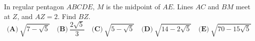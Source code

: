 In regular pentagon $ABCDE$, $M$ is the midpoint of $AE$. Lines $AC$ and $BM$ meet at $Z$, and $AZ=2$. Find $BZ$.
\[\textbf{(A)}~\sqrt{7-\sqrt5}\quad\textbf{(B)}~\dfrac{2\sqrt5}{3}\quad\textbf{(C)}~\sqrt{5-\sqrt5}\quad\textbf{(D)}~\sqrt{14-2\sqrt5}\quad\textbf{(E)}~\sqrt{70-15\sqrt5}\]
